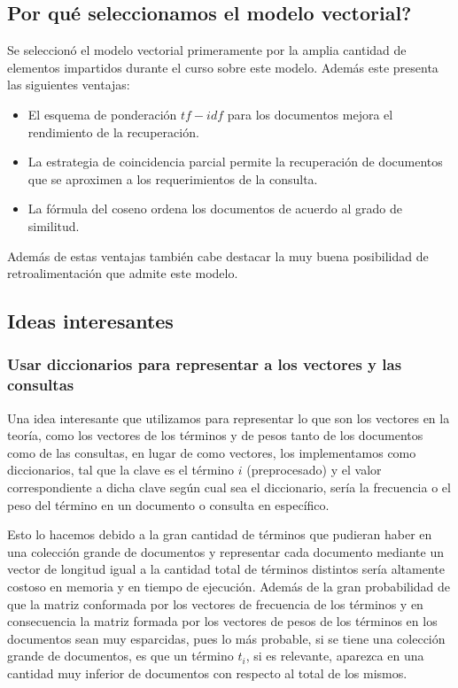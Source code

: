 \documentclass[runningheads]{llncs}
\begin{document}
	\subsection{\textquestiondown Por qu\'e seleccionamos el modelo vectorial?}
	
	Se seleccion\'o el modelo vectorial primeramente por la amplia cantidad de elementos impartidos durante el curso sobre este modelo. Adem\'as este presenta las siguientes ventajas:
	
	\begin{itemize}
		\item El esquema de ponderaci\'on $tf-idf$ para los documentos mejora el rendimiento de la recuperaci\'on.
		\item La estrategia de coincidencia parcial permite la recuperaci\'on de documentos que se aproximen a los requerimientos de la consulta.
		\item La f\'ormula del coseno ordena los documentos de acuerdo al grado de similitud.
	\end{itemize}

	Adem\'as de estas ventajas tambi\'en cabe destacar la muy buena posibilidad de retroalimentaci\'on que admite este modelo.
	
	\subsection{Ideas interesantes}
	
	\subsubsection{Usar diccionarios para representar a los vectores y las consultas}
	Una idea interesante que utilizamos para representar lo que son los vectores en la teor\'ia, como los vectores de los t\'erminos y de pesos tanto de los documentos como de las consultas, en lugar de como vectores, los implementamos como diccionarios, tal que la clave es el t\'ermino $i$ (preprocesado) y el valor correspondiente a dicha clave seg\'un cual sea el diccionario, ser\'ia la frecuencia o el peso del t\'ermino en un documento o consulta en espec\'ifico. 
	
	Esto lo hacemos debido a la gran cantidad de t\'erminos que pudieran haber en una colecci\'on grande de documentos y representar cada documento mediante un vector de longitud igual a la cantidad total de t\'erminos distintos ser\'ia altamente costoso en memoria y en tiempo de ejecuci\'on. Adem\'as de la gran probabilidad de que la matriz conformada por los vectores de frecuencia de los t\'erminos y en consecuencia la matriz formada por los vectores de pesos de los t\'erminos en los documentos sean muy esparcidas, pues lo m\'as probable, si se tiene una colecci\'on grande de documentos, es que un t\'ermino $t_i$, si es relevante, aparezca en una cantidad muy inferior de documentos con respecto al total de los mismos.
	
\end{document}
